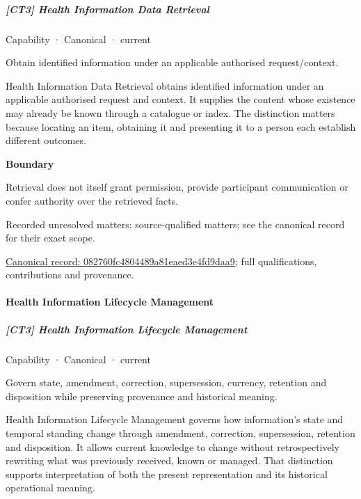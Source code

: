 \subparagraph{[CT3] Health Information Data Retrieval}

\label{element:082760fc4804489a81eaed3e4fd9daa9}
{\small Capability · Canonical · current}\par

Obtain identified information under an applicable authorised request/context.



Health Information Data Retrieval obtains identified information under an applicable authorised request and context. It supplies the content whose existence may already be known through a catalogue or index. The distinction matters because locating an item, obtaining it and presenting it to a person each establish different outcomes.



\textbf{Boundary}



Retrieval does not itself grant permission, provide participant communication or confer authority over the retrieved facts.


{\small Recorded unresolved matters: source-qualified matters; see the canonical record for their exact scope.}\par
{\footnotesize \href{../../../../continuum/strategy/capability/082760fc4804489a81eaed3e4fd9daa9.md}{Canonical record: 082760fc4804489a81eaed3e4fd9daa9}; full qualifications, contributions and provenance.}\par
\paragraph{Health Information Lifecycle Management}

\subparagraph{[CT3] Health Information Lifecycle Management}

\label{element:874cd3b294184f928dbb7f656abd97f0}
{\small Capability · Canonical · current}\par

Govern state, amendment, correction, supersession, currency, retention and disposition while preserving provenance and historical meaning.



Health Information Lifecycle Management governs how information's state and temporal standing change through amendment, correction, supersession, retention and disposition. It allows current knowledge to change without retrospectively rewriting what was previously received, known or managed. That distinction supports interpretation of both the present representation and its historical operational meaning.



